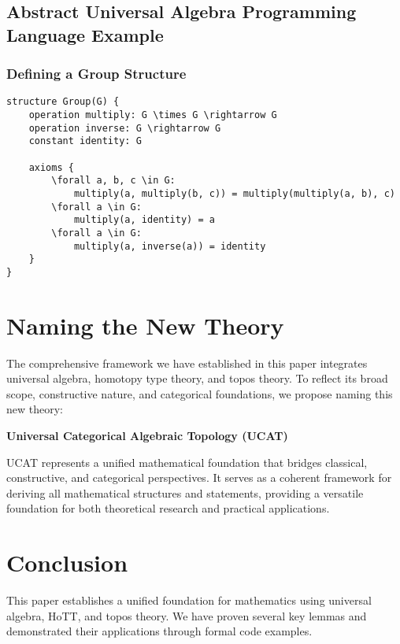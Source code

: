 \documentclass{article}
\begin{document}
\subsection{Abstract Universal Algebra Programming Language Example}


\subsubsection{Defining a Group Structure}

\begin{lstlisting}
structure Group(G) {
    operation multiply: G \times G \rightarrow G
    operation inverse: G \rightarrow G
    constant identity: G

    axioms {
        \forall a, b, c \in G:
            multiply(a, multiply(b, c)) = multiply(multiply(a, b), c)
        \forall a \in G:
            multiply(a, identity) = a
        \forall a \in G:
            multiply(a, inverse(a)) = identity
    }
}
\end{lstlisting}

\section{Naming the New Theory}

The comprehensive framework we have established in this paper integrates universal algebra, homotopy type theory, and topos theory. To reflect its broad scope, constructive nature, and categorical foundations, we propose naming this new theory:

\begin{center}
    \textbf{Universal Categorical Algebraic Topology (UCAT)}
\end{center}

\noindent UCAT represents a unified mathematical foundation that bridges classical, constructive, and categorical perspectives. It serves as a coherent framework for deriving all mathematical structures and statements, providing a versatile foundation for both theoretical research and practical applications.

\section{Conclusion}

This paper establishes a unified foundation for mathematics using universal algebra, HoTT, and topos theory. We have proven several key lemmas and demonstrated their applications through formal code examples.
\end{document}
